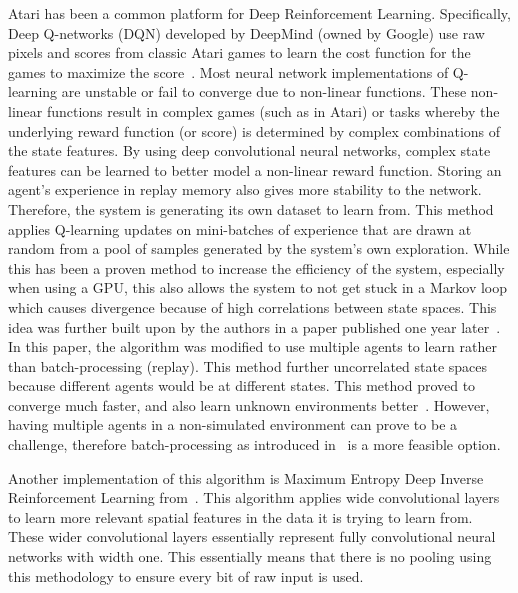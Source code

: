 \documentclass[12pt,american]{report}
\begin{document}
	Atari has been a common platform for Deep Reinforcement Learning. Specifically, Deep Q-networks (DQN) developed by DeepMind (owned by Google) use raw pixels and scores from classic Atari games to learn the cost function for the games to maximize the score~\cite{mnih2015human}. Most neural network implementations of Q-learning are unstable or fail to converge due to non-linear functions. These non-linear functions result in complex games (such as in Atari) or tasks whereby the underlying reward function (or score) is determined by complex combinations of the state features. By using deep convolutional neural networks, complex state features can be learned to better model a non-linear reward function. Storing an agent's experience in replay memory also gives more stability to the network. Therefore, the system is generating its own dataset to learn from. This method applies Q-learning updates on mini-batches of experience that are drawn at random from a pool of samples generated by the system's own exploration.  While this has been a proven method to increase the efficiency of the system, especially when using a GPU, this also allows the system to not get stuck in a Markov loop which causes divergence because of high correlations between state spaces.  This idea was further built upon by the authors in a paper published one year later~\cite{mnih2016asynchronous}. In this paper, the algorithm was modified to use multiple agents to learn rather than batch-processing (replay). This method further uncorrelated state spaces because different agents would be at different states. This method proved to converge much faster, and also learn unknown environments better~\cite{mnih2016asynchronous}. However, having multiple agents in a non-simulated environment can prove to be a challenge, therefore batch-processing as introduced in~\cite{mnih2015human} is a more feasible option. 

Another implementation of this algorithm is Maximum Entropy Deep Inverse Reinforcement Learning from~\cite{wulfmeier2015maximum}. This algorithm applies wide convolutional layers to learn more relevant spatial features in the data it is trying to learn from. These wider convolutional layers essentially represent fully convolutional neural networks with width one. This essentially means that there is no pooling using this methodology to ensure every bit of raw input is used. 

\end{document}

